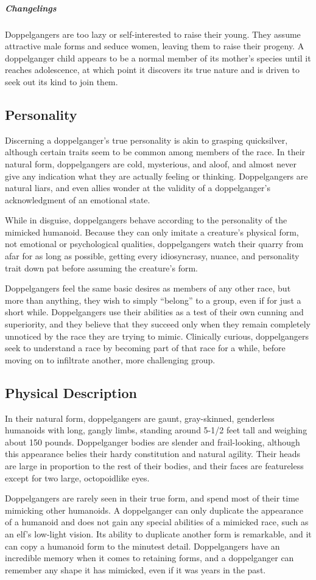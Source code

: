 \subparagraph{Changelings}
{Doppelgangers are too lazy or self-interested to raise their young. They assume attractive male forms and seduce women, leaving them to raise their progeny. A doppelganger child appears to be a normal member of its mother’s species until it reaches adolescence, at which point it discovers its true nature and is driven to seek out its kind to join them. \cite{d-sre}}

\subsection{Personality}
{Discerning a doppelganger’s true personality is akin to grasping quicksilver, although certain traits seem to be common among members of the race. In their natural form, doppelgangers are cold, mysterious, and aloof, and almost never give any indication what they are actually feeling or thinking. Doppelgangers are natural liars, and even allies wonder at the validity of a doppelganger’s acknowledgment of an emotional state.

While in disguise, doppelgangers behave according to the personality of the mimicked humanoid. Because they can only imitate a creature’s physical form, not emotional or psychological qualities, doppelgangers watch their quarry from afar for as long as possible, getting every idiosyncrasy, nuance, and personality trait down pat before assuming the creature’s form.

Doppelgangers feel the same basic desires as members of any other race, but more than anything, they wish to simply “belong” to a group, even if for just a short while. Doppelgangers use their abilities as a test of their own cunning and superiority, and they believe that they succeed only when they remain completely unnoticed by the race they are trying to mimic. Clinically curious, doppelgangers seek to understand a race by becoming part of that race for a while, before moving on to infiltrate another, more challenging group. \cite{d-destiny}}

\subsection{Physical Description}
{In their natural form, doppelgangers are gaunt, gray-skinned, genderless humanoids with long, gangly limbs, standing around 5-1/2 feet tall and weighing about 150 pounds. Doppelganger bodies are slender and frail-looking, although this appearance belies their hardy constitution and natural agility. Their heads are large in proportion to the rest of their bodies, and their faces are featureless except for two large, octopoidlike eyes.

Doppelgangers are rarely seen in their true form, and spend most of their time mimicking other humanoids. A doppelganger can only duplicate the appearance of a humanoid and does not gain any special abilities of a mimicked race, such as an elf’s low-light vision. Its ability to duplicate another form is remarkable, and it can copy a humanoid form to the minutest detail. Doppelgangers have an incredible memory when it comes to retaining forms, and a doppelganger can remember any shape it has mimicked, even if it was years in the past. \cite{d-destiny}}

